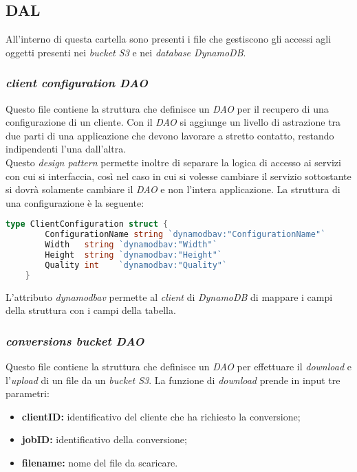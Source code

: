 \subsection{DAL}

All'interno di questa cartella sono presenti i file che gestiscono gli accessi
agli oggetti presenti nei \emph{bucket S3} e nei \emph{database DynamoDB}.

\subsubsection{\emph{client configuration DAO}}

Questo file contiene la struttura che definisce un \emph{DAO} per il recupero di
una configurazione di un cliente. Con il \emph{DAO} si aggiunge un livello di
astrazione tra due parti di una applicazione che devono lavorare a stretto
contatto, restando indipendenti l'una dall'altra.\\
Questo \emph{design pattern} permette inoltre di separare la logica di accesso
ai servizi con cui si interfaccia, così nel caso in cui si volesse cambiare il
servizio sottostante si dovrà solamente cambiare il \emph{DAO} e non l'intera
applicazione. La struttura di una configurazione è la seguente:
\begin{lstlisting}[language=go]
type ClientConfiguration struct {
        ConfigurationName string `dynamodbav:"ConfigurationName"`
        Width   string `dynamodbav:"Width"`
        Height  string `dynamodbav:"Height"`
        Quality int    `dynamodbav:"Quality"`
    }
\end{lstlisting}
L'attributo \emph{dynamodbav} permette al \emph{client} di \emph{DynamoDB} di
mappare i campi della struttura con i campi della tabella.\\

\subsubsection{\emph{conversions bucket DAO}}

Questo file contiene la struttura che definisce un \emph{DAO} per effettuare il
\emph{download} e l'\emph{upload} di un file da un \emph{bucket S3}. La funzione
di \emph{download} prende in input tre parametri:
\begin{itemize}
    \item \textbf{clientID:} identificativo del cliente che ha richiesto la
          conversione;
    \item \textbf{jobID:} identificativo della conversione;
    \item \textbf{filename:} nome del file da scaricare.
\end{itemize}


